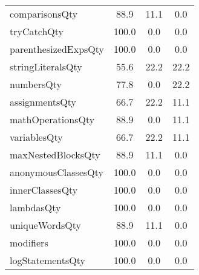 \begin{tabular}{lccc}
comparisonsQty & 88.9 & 11.1 & 0.0 \\
tryCatchQty & 100.0 & 0.0 & 0.0 \\
parenthesizedExpsQty & 100.0 & 0.0 & 0.0 \\
stringLiteralsQty & 55.6 & 22.2 & 22.2 \\
numbersQty & 77.8 & 0.0 & 22.2 \\
assignmentsQty & 66.7 & 22.2 & 11.1 \\
mathOperationsQty & 88.9 & 0.0 & 11.1 \\
variablesQty & 66.7 & 22.2 & 11.1 \\
maxNestedBlocksQty & 88.9 & 11.1 & 0.0 \\
anonymousClassesQty & 100.0 & 0.0 & 0.0 \\
innerClassesQty & 100.0 & 0.0 & 0.0 \\
lambdasQty & 100.0 & 0.0 & 0.0 \\
uniqueWordsQty & 88.9 & 11.1 & 0.0 \\
modifiers & 100.0 & 0.0 & 0.0 \\
logStatementsQty & 100.0 & 0.0 & 0.0 \\
\bottomrule
              \end{tabular}
            